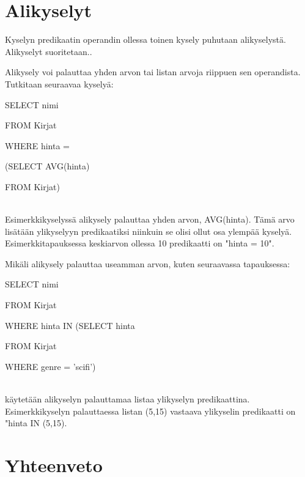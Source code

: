 \documentclass[finnish]{tktltiki2}
\theoremstyle{definition}
\theoremstyle{remark}
\begin{document}
\section{Alikyselyt}

Kyselyn predikaatin operandin ollessa toinen kysely puhutaan alikyselystä. Alikyselyt suoritetaan..

Alikysely voi palauttaa yhden arvon tai listan arvoja riippuen sen operandista. Tutkitaan seuraavaa kyselyä:

\newline

\begin{frame}

SELECT nimi

FROM Kirjat

WHERE hinta = 

(SELECT AVG(hinta)
		
FROM Kirjat)
\end{frame}
\\\newline
Esimerkkikyselyssä alikysely palauttaa yhden arvon, AVG(hinta). Tämä arvo lisätään ylikyselyyn predikaatiksi niinkuin se olisi ollut osa ylempää kyselyä. Esimerkkitapauksessa keskiarvon ollessa 10 predikaatti on "hinta = 10".

Mikäli alikysely palauttaa useamman arvon, kuten seuraavassa tapauksessa:

\newline

\begin{frame}

SELECT nimi

FROM Kirjat

WHERE hinta IN (SELECT hinta
		
	FROM Kirjat

	WHERE genre = 'scifi')
\end{frame}
\\\newline
käytetään alikyselyn palauttamaa listaa ylikyselyn predikaattina. Esimerkkikyselyn palauttaessa listan (5,15) vastaava ylikyselin predikaatti on "hinta IN (5,15).

\section{Yhteenveto}

\newpage



%


\end{document}
